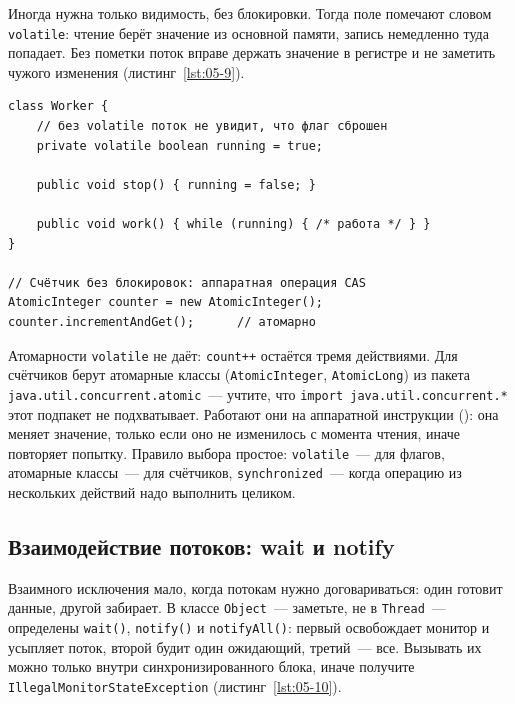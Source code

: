 Иногда нужна только видимость, без блокировки. Тогда поле помечают словом
\texttt{volatile}: чтение берёт значение из основной памяти, запись немедленно
туда попадает. Без пометки поток вправе держать значение в регистре и не
заметить чужого изменения (листинг~\ref{lst:05-9}).

\begin{listing}[H]
\begin{verbatim}
class Worker {
    // без volatile поток не увидит, что флаг сброшен
    private volatile boolean running = true;

    public void stop() { running = false; }

    public void work() { while (running) { /* работа */ } }
}

// Счётчик без блокировок: аппаратная операция CAS
AtomicInteger counter = new AtomicInteger();
counter.incrementAndGet();      // атомарно
\end{verbatim}
\caption{Флаг остановки и атомарный счётчик}
\label{lst:05-9}
\end{listing}

Атомарности \texttt{volatile} не даёт: \texttt{count++} остаётся тремя
действиями. Для счётчиков берут атомарные классы (\texttt{AtomicInteger},
\texttt{AtomicLong}) из пакета \texttt{java.util.concurrent.atomic}~--- учтите,
что \texttt{import java.util.concurrent.*} этот подпакет не подхватывает.
Работают они на аппаратной инструкции  (): она
меняет значение, только если оно не изменилось с момента чтения, иначе повторяет
попытку. Правило выбора простое: \texttt{volatile}~--- для флагов, атомарные
классы~--- для счётчиков, \texttt{synchronized}~--- когда операцию из нескольких
действий надо выполнить целиком.

\subsection{Взаимодействие потоков: wait и notify}

Взаимного исключения мало, когда потокам нужно договариваться: один готовит
данные, другой забирает. В классе \texttt{Object}~--- заметьте, не в
\texttt{Thread}~--- определены \texttt{wait()}, \texttt{notify()} и
\texttt{notifyAll()}: первый освобождает монитор и усыпляет поток, второй будит
один ожидающий, третий~--- все. Вызывать их можно только внутри
синхронизированного блока, иначе получите \texttt{IllegalMonitorStateException}
(листинг~\ref{lst:05-10}).

